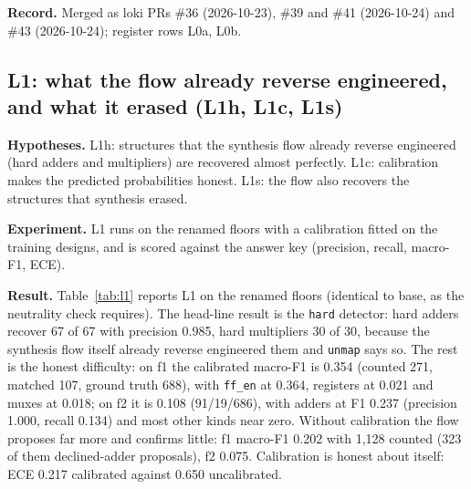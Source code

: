 \documentclass[conference]{IEEEtran}
\newcommand{\hev}[1]{\par\smallskip\noindent\textbf{#1}}
\newcommand{\code}[1]{\texttt{#1}}
\begin{document}
\hev{Record.} Merged as loki PRs \#36 (2026-10-23), \#39 and \#41 (2026-10-24) and \#43 (2026-10-24); register rows L0a, L0b.

\subsection{L1: what the flow already reverse engineered, and what it erased (L1h, L1c, L1s)}
\label{sec:l1-results}

\hev{Hypotheses.} L1h: structures that the synthesis flow already reverse engineered (hard
adders and multipliers) are recovered almost perfectly. L1c: calibration makes the predicted
probabilities honest. L1s: the flow also recovers the structures that synthesis erased.

\hev{Experiment.} L1 runs on the renamed floors with a calibration fitted on the training
designs, and is scored against the answer key (precision, recall, macro-F1, ECE).

\hev{Result.} 
Table~\ref{tab:l1} reports L1 on the renamed floors (identical to base, as the neutrality
check requires). The head-line result is the \code{hard} detector: hard adders recover 67 of
67 with precision 0.985, hard multipliers 30 of 30, because the synthesis flow itself already
reverse engineered them and \code{unmap} says so. The rest is the honest difficulty: on f1
the calibrated macro-F1 is 0.354 (counted 271, matched 107, ground truth 688), with
\code{ff\_en} at 0.364, registers at 0.021 and muxes at 0.018; on f2 it is 0.108 (91/19/686),
with adders at F1 0.237 (precision 1.000, recall 0.134) and most other kinds near zero.
Without calibration the flow proposes far more and confirms little: f1 macro-F1 0.202 with
1,128 counted (323 of them declined-adder proposals), f2 0.075. Calibration is honest about
itself: ECE 0.217 calibrated against 0.650 uncalibrated.
\end{document}
